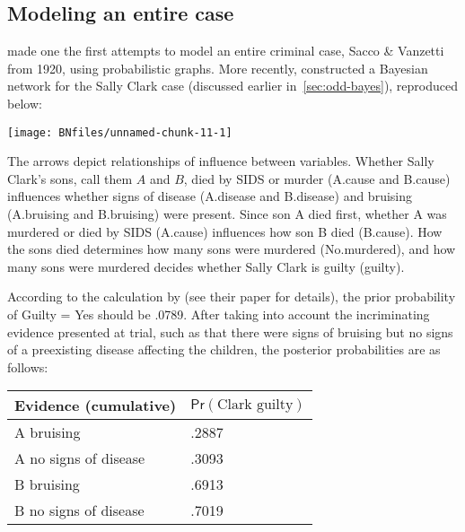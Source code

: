 \documentclass{article}
\newcommand{\pr}{\mathsf{Pr}}
\begin{document}
 




 
 







\subsection{Modeling an entire case}\label{subsec:completeBN}

\cite{kadane2011probabilistic}
made one the first attempts to model an entire criminal case, Sacco \& Vanzetti from 1920, using probabilistic graphs. More recently, \cite{Fenton2018Risk} constructed a Bayesian network for the Sally Clark case (discussed earlier in~\ref{sec:odd-bayes}), reproduced below:


\begin{center}\texttt{[image: BNfiles/unnamed-chunk-11-1]} \end{center}

\noindent
The arrows depict relationships of influence between variables. Whether Sally Clark's sons, call them \(A\) and \(B\), died by SIDS or murder (\textsf{A.cause} and \textsf{B.cause}) influences whether signs of disease (\textsf{A.disease} and \textsf{B.disease}) and bruising (\textsf{A.bruising} and \textsf{B.bruising})  were present. %
Since son A died first, whether A was murdered or died by SIDS (\textsf{A.cause}) influences how son B died (\textsf{B.cause}). 
How the sons died %
determines how many sons were murdered (\textsf{No.murdered}), and how many sons were murdered decides whether Sally Clark is guilty (\textsf{guilty}). 


According to the calculation by \cite{Fenton2018Risk} (see their paper for details), the prior probability of \textrm{Guilty = Yes} should be .0789. After taking into account the incriminating evidence presented at trial, such as that there were signs of bruising but no signs of a preexisting disease affecting the children, the posterior probabilities are as follows:

\begin{center}
\begin{tabular}{@{}ll@{}}
\toprule
Evidence (cumulative) & $\pr(\textrm{Clark guilty})$ 
\\ \midrule 
A bruising& .2887\\
A no signs of disease & .3093\\
B bruising & .6913\\
B no signs of disease  & .7019\\
 \bottomrule
\end{tabular}
\end{center}
\end{document}

